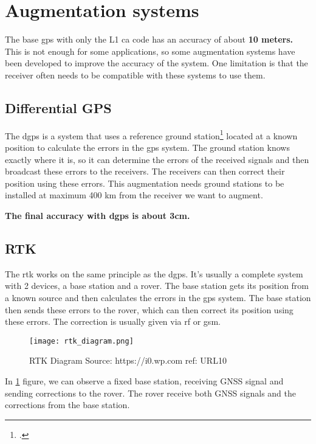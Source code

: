 \section{Augmentation systems}

The base \gls{gps} with only the L1 \gls{ca} code has an accuracy of about \textbf{10 meters.} This is not enough for some applications, so some augmentation systems have been developed to improve the accuracy of the system. One limitation is that the receiver often needs to be compatible with these systems to use them.

\subsection{Differential GPS}

The \gls{dgps} is a system that uses a reference ground station\footcite{noauthor_23_nodate} located at a known position to calculate the errors in the \gls{gps} system. The ground station knows exactly where it is, so it can determine the errors of the received signals and then broadcast these errors to the receivers. The receivers can then correct their position using these errors. This augmentation needs ground stations to be installed at maximum 400 km from the receiver we want to augment.

\textbf{The final accuracy with \gls{dgps} is about 3cm.}


\subsection{RTK}

The \gls{rtk} works on the same principle as the \gls{dgps}. It's usually a complete system with 2 devices, a base station and a rover. The base station gets its position from a known source and then calculates the errors in the \gls{gps} system. The base station then sends these errors to the rover, which can then correct its position using these errors. The correction is usually given via \gls{rf} or \gls{gsm}.



\begin{figure}[H]
	\centering
	\texttt{[image: rtk\_diagram.png]}
	\caption[RTK Diagram]{RTK Diagram Source: https://i0.wp.com ref: URL10}
	\label{fig:rtk}
\end{figure}

In \ref{fig:rtk} figure, we can observe a fixed base station, receiving GNSS signal and sending corrections to the rover. The rover receive both GNSS signals and the corrections from the base station.


